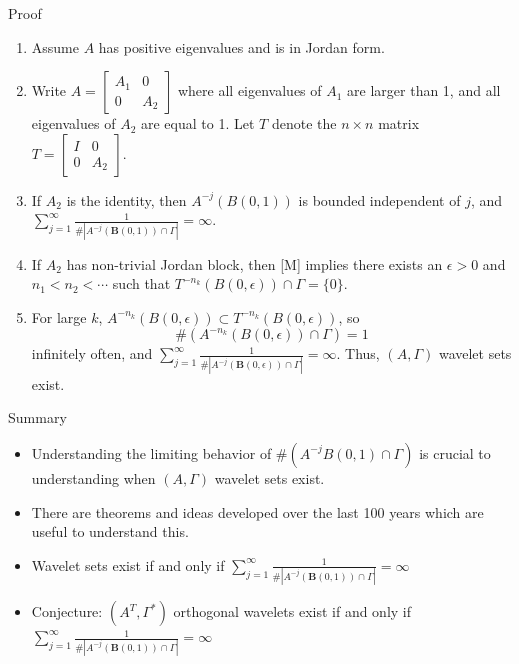 \documentclass{sintefbeamer}
\begin{document}
\begin{frame}{Proof}
\begin{enumerate}
    \item Assume $A$ has positive eigenvalues and is in Jordan form.
\pause
      \item Write $A = \begin{bmatrix}
  A_1&0\\
  0&A_2
  \end{bmatrix}$
  where all eigenvalues of $A_1$ are larger than 1, and all eigenvalues of $A_2$ are equal to 1. Let $T$ denote the $n \times n$ matrix $T = \begin{bmatrix}
  I&0\\
  0&A_2
  \end{bmatrix}.$

  \pause \item If $A_2$ is the identity, then $A^{-j}(B(0, 1))$ is bounded independent of $j$, and $\sum_{j=1}^\infty \frac {1}{\# \left|A^{-j}(\mathbf B(0,1)) \cap \Gamma \right |} =\infty$.
  \pause \item If $A_2$ has non-trivial Jordan block, then [M] implies there exists an $\epsilon > 0$ and $n_1 < n_2 < \cdots$ such that $T^{-n_k}(B(0, \epsilon)) \cap \Gamma = \{0\}$.
  \pause \item For large $k$, $A^{-n_k}(B(0, \epsilon)) \subset T^{-n_k}(B(0, \epsilon))$, so 
  $$
  \#(A^{-n_k}(B(0, \epsilon)) \cap \Gamma) = 1 
  $$
  infinitely often, and $\sum_{j=1}^\infty \frac{1}{\# \left|A^{-j}(\mathbf B(0,\epsilon)) \cap \Gamma \right |} =\infty.$ Thus, $(A, \Gamma)$ wavelet sets exist.
\end{enumerate}
  
  
\end{frame}

\begin{frame}{Summary}

\begin{itemize}
\item Understanding the limiting behavior of $\#\left(A^{-j}B(0, 1) \cap \Gamma\right)$ is crucial to understanding when $(A, \Gamma)$ wavelet sets exist.
\pause \item There are theorems and ideas developed over the last 100 years which are useful to understand this.
\pause \item Wavelet sets exist if and only if $\sum_{j=1}^\infty \frac{1}{\# \left|A^{-j}(\mathbf B(0,1)) \cap \Gamma \right |} =\infty$
\pause \item Conjecture: $(A^T, \Gamma^*)$ orthogonal wavelets exist if and only if $\sum_{j=1}^\infty \frac{1}{\# \left|A^{-j}(\mathbf B(0,1)) \cap \Gamma \right |} =\infty$
\end{itemize}

\end{frame}
\end{document}
